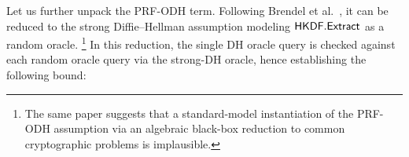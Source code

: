 Let us further unpack the PRF-ODH term.
Following Brendel et al.~\cite{C:BFGJ17}, it can be reduced to the strong Diffie--Hellman assumption modeling $\mathsf{HKDF}.\mathsf{Extract}$ as a random oracle.%
\footnote{The same paper suggests that a standard-model instantiation of the PRF-ODH assumption via an algebraic black-box reduction to common cryptographic problems is implausible.}
In this reduction, the single DH oracle query is checked against each random oracle query via the strong-DH oracle, hence establishing the following bound:
\

